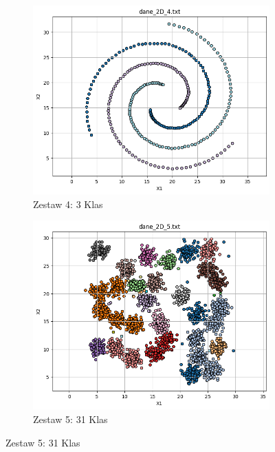\documentclass[polish,12pt,a4paper]{extarticle}
\begin{document}
\begin{figure}[h!]
    \begin{subfigure}[b]{0.30\textwidth}
        \includegraphics[width=\linewidth]{img/spectral/singular/data4.png}
        \captionsetup{labelformat=empty}
        \caption{Zestaw 4: 3 Klas}
    \end{subfigure}
    \hfill
    \begin{subfigure}[b]{0.30\textwidth}
        \includegraphics[width=\linewidth]{img/spectral/singular/data5.png}
        \captionsetup{labelformat=empty}
        \caption{Zestaw 5: 31 Klas}
    \end{subfigure}

\end{figure}
\end{document}
